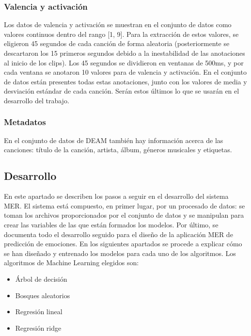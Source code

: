 \documentclass[12pt,a4paper,Spanish]{article}
\begin{document}
\subsubsection{Valencia y activación}
Los datos de valencia y activación se muestran en el conjunto de datos como valores continuos dentro del rango [1, 9].
\newline
Para la extracción de estos valores, se eligieron 45 segundos de cada canción de forma aleatoria (posteriormente se descartaron los 15 primeros segundos debido a la inestabilidad de las anotaciones al inicio de los clips). Los 45 segundos se dividieron en ventanas de 500ms, y por cada ventana se anotaron 10 valores para de valencia y activación.
\newline
En el conjunto de datos están presentes todas estas anotaciones, junto con los valores de media y desviación estándar de cada canción. Serán estos últimos lo que se usarán en el desarrollo del trabajo.



\subsubsection{Metadatos}
En el conjunto de datos de DEAM \cite{AlajankiEmoInMusicAnalysis} también hay información acerca de las canciones: título de la canción, artista, álbum, géneros musicales y etiquetas.




\subsection{Desarrollo}
En este apartado se describen los pasos a seguir en el desarrollo del sistema MER. El sistema está compuesto, en primer lugar, por un procesado de datos: se toman los archivos proporcionados por el conjunto de datos y se manipulan para crear las variables de las que están formados los modelos.
\newline
Por último, se documenta todo el desarrollo seguido para el diseño de la aplicación MER de predicción de emociones. En los siguientes apartados se procede a explicar cómo se han diseñado y entrenado los modelos  para cada uno de los algoritmos. Los algoritmos de Machine Learning elegidos son:
\begin{itemize}
	\item Árbol de decisión
	\item Bosques aleatorios
	\item Regresión lineal
	\item Regresión ridge
\end{itemize}
\end{document}
